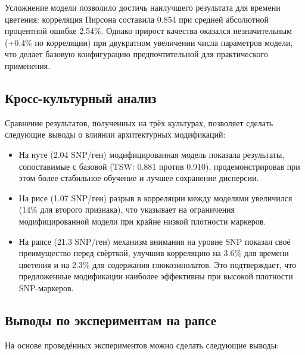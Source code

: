 Усложнение модели позволило достичь наилучшего результата для времени 
цветения: корреляция Пирсона составила 0.854 при средней абсолютной 
процентной ошибке 2.54\%. Однако прирост качества оказался 
незначительным (+0.4\% по корреляции) при двукратном увеличении числа 
параметров модели, что делает базовую конфигурацию предпочтительной 
для практического применения.

\subsection{Кросс-культурный анализ}

Сравнение результатов, полученных на трёх культурах, позволяет сделать 
следующие выводы о влиянии архитектурных модификаций:

\begin{itemize}
	\item На нуте (2.04 SNP/ген) модифицированная модель показала 
	результаты, сопоставимые с базовой (TSW: 0.881 против 0.910), 
	продемонстрировав при этом более стабильное обучение и лучшее 
	сохранение дисперсии.
	
	\item На рисе (1.07 SNP/ген) разрыв в корреляции между моделями 
	увеличился (14\% для второго признака), что указывает на 
	ограничения модифицированной модели при крайне низкой плотности 
	маркеров.
	
	\item На рапсе (21.3 SNP/ген) механизм внимания на уровне SNP 
	показал своё преимущество перед свёрткой, улучшив корреляцию 
	на 3.6\% для времени цветения и на 2.3\% для содержания 
	глюкозинолатов. Это подтверждает, что предложенные модификации 
	наиболее эффективны при высокой плотности SNP-маркеров.
\end{itemize}

\subsection{Выводы по экспериментам на рапсе}

На основе проведённых экспериментов можно сделать следующие выводы:

